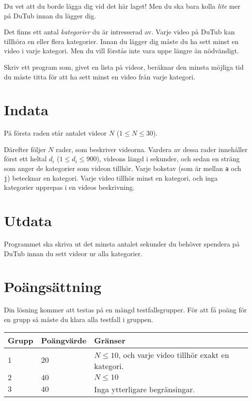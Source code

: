 Du vet att du borde lägga dig vid det här laget! Men du ska bara kolla {\em lite} mer på DuTub innan du lägger dig.

Det finns ett antal {\em kategorier} du är intresserad av. Varje
video på DuTub kan tillhöra en eller flera kategorier. Innan du lägger
dig måste du ha sett minst en video i varje kategori. Men du vill
förstås inte vara uppe längre än nödvändigt.

Skriv ett program som, givet en lista på videor, beräknar den minsta möjliga tid du måste titta för att ha sett minst en video från varje kategori.

\section*{Indata}
På första raden står antalet videor $N$ ($1 \le N \le 30$).

Därefter följer $N$ rader, som beskriver videorna.
Vardera av dessa rader innehåller först ett heltal $d_i$ ($1 \le d_i \le 900$), videons längd i sekunder, och sedan en sträng som anger de kategorier som videon tillhör.
Varje bokstav (som är mellan \texttt a och \texttt j) betecknar en kategori.
Varje video tillhör minst en kategori, och inga kategorier upprepas i en videos beskrivning.

\section*{Utdata}
Programmet ska skriva ut det minsta antalet sekunder du behöver spendera på DuTub innan du sett videor ur alla kategorier.

\section*{Poängsättning}
Din lösning kommer att testas på en mängd testfallsgrupper.
För att få poäng för en grupp så måste du klara alla testfall i gruppen.

\noindent
\begin{tabular}{| l | l | p{12cm} |}
  \hline
  Grupp & Poängvärde & Gränser \\ \hline
  $1$    & $20$        & $N \le 10$, och varje video tillhör exakt en kategori. \\ \hline 
  $2$    & $40$        & $N \le 10$ \\ \hline
  $3$    & $40$        & Inga ytterligare begränsingar. \\ \hline 
\end{tabular}

